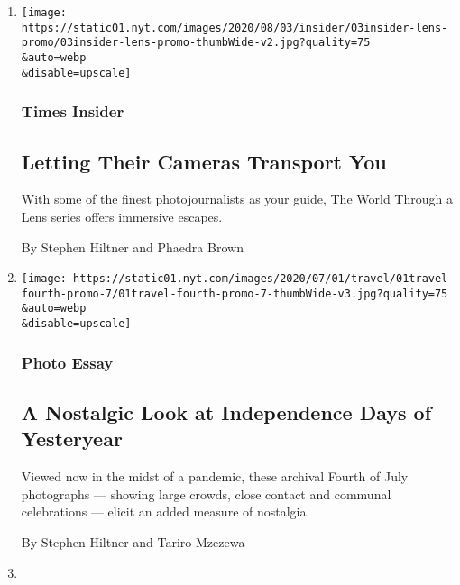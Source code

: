 \begin{enumerate}
\def\labelenumi{\arabic{enumi}.}
\item
  \href{/2020/08/03/insider/letting-their-cameras-transport-you.html}{}

  \texttt{[image: https://static01.nyt.com/images/2020/08/03/insider/03insider-lens-promo/03insider-lens-promo-thumbWide-v2.jpg?quality=75\\\&auto=webp\\\&disable=upscale]}

  \hypertarget{times-insider}{%
  \subsubsection{Times Insider}\label{times-insider}}

  \hypertarget{letting-their-cameras-transport-you}{%
  \subsection{Letting Their Cameras Transport
  You}\label{letting-their-cameras-transport-you}}

  With some of the finest photojournalists as your guide, The World
  Through a Lens series offers immersive escapes.

  By Stephen Hiltner and Phaedra Brown
\item
  \href{/2020/07/01/travel/independence-day-archival-photos.html}{}

  \texttt{[image: https://static01.nyt.com/images/2020/07/01/travel/01travel-fourth-promo-7/01travel-fourth-promo-7-thumbWide-v3.jpg?quality=75\\\&auto=webp\\\&disable=upscale]}

  \hypertarget{photo-essay}{%
  \subsubsection{Photo Essay}\label{photo-essay}}

  \hypertarget{a-nostalgic-look-at-independence-days-of-yesteryear}{%
  \subsection{A Nostalgic Look at Independence Days of
  Yesteryear}\label{a-nostalgic-look-at-independence-days-of-yesteryear}}

  Viewed now in the midst of a pandemic, these archival Fourth of July
  photographs --- showing large crowds, close contact and communal
  celebrations --- elicit an added measure of nostalgia.

  By Stephen Hiltner and Tariro Mzezewa
\item
  \href{/2020/04/15/travel/colombia-lost-city-ciudad-perdida.html}{}


\end{enumerate}
